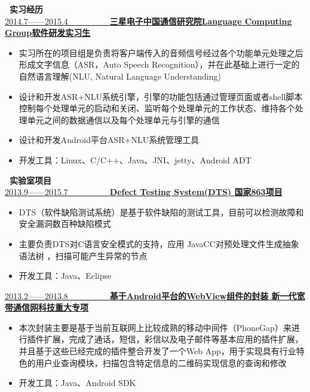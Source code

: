 \documentclass[UTF8, winfonts]{ctexart}
\begin{document}
\noindent \textbf{ \heiti \faBriefcase\ 实习经历}\\
\uline{2014.7——2015.4~~~~~~~~~~\bf{三星电子中国通信研究院Language Computing Group}\hfill \bf{软件研发实习生}}
\begin{itemize}
  \setlength{\itemsep}{0pt}
  \setlength{\parsep}{3pt}
  \setlength{\parskip}{3pt}
  \item {}实习所在的项目组是负责将客户端传入的音频信号经过各个功能单元处理之后形成文字信息（ASR，Auto Speech Recognition），并在此基础上进行一定的自然语言理解(NLU, Natural Language Understanding)
  \item {}设计和开发ASR+NLU系统引擎，引擎的功能包括通过管理页面或者shell脚本控制每个处理单元的启动和关闭、监听每个处理单元的工作状态、维持各个处理单元之间的数据通信以及每个处理单元与引擎的通信
  \item {}设计和开发Android平台ASR+NLU系统管理工具
  \item {}开发工具：Linux、C/C++、Java、JNI、jetty、Android ADT
\end{itemize}
\noindent \textbf{ \heiti \faUniversity\ 实验室项目}\\
\uline{2013.9——2015.7~~~~~~~~~~\bf{Defect Testing System(DTS)} \hfill \bf{国家863项目}}
\begin{itemize}
  \setlength{\itemsep}{0pt}
  \setlength{\parsep}{3pt}
  \setlength{\parskip}{3pt}
  \item {}DTS（软件缺陷测试系统）是基于软件缺陷的测试工具，目前可以检测故障和安全漏洞数百种缺陷模式
  \item {}主要负责DTS对C语言安全模式的支持，应用 JavaCC对预处理文件生成抽象语法树 ，扫描可能产生异常的节点
  \item {}开发工具：Java、Eclipse
\end{itemize}
\uline{2013.2——2013.8~~~~~~~~~~\bf{基于Android平台的WebView组件的封装} \hfill \bf{新一代宽带通信网科技重大专项}}
\begin{itemize}
  \setlength{\itemsep}{0pt}
  \setlength{\parsep}{3pt}
  \setlength{\parskip}{3pt}
  \item {}本次封装主要是基于当前互联网上比较成熟的移动中间件（PhoneGap）来进行插件扩展，完成了通话，短信，彩信以及电子邮件等基本应用的插件扩展，并且基于这些已经完成的插件整合开发了一个Web App，用于实现具有行业特色的用户业查询模块，扫描包含特定信息的二维码实现信息的查询和修改
  \item {}开发工具：Java、Android SDK
\end{itemize}
\end{document}
